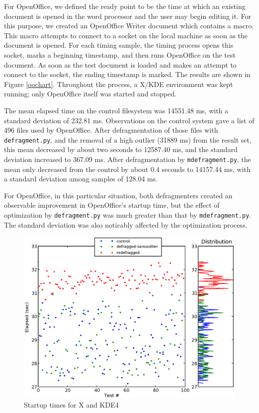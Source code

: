 \documentclass[10pt,twocolumn,letterpaper]{article}
\begin{document}
For OpenOffice, we defined the ready point to be the time at which an existing document is opened in the word processor and the user may begin editing it. For this purpose, we created an OpenOffice Writer document which contains a macro. This macro attempts to connect to a socket on the local machine as soon as the document is opened. For each timing sample, the timing process opens this socket, marks a beginning timestamp, and then runs OpenOffice on the test document. As soon as the test document is loaded and makes an attempt to connect to the socket, the ending timestamp is marked. The results are shown in Figure \ref{oochart}. Throughout the process, a X/KDE environment was kept running; only OpenOffice itself was started and stopped.

The mean elapsed time on the control filesystem was 14551.48 ms, with a standard deviation of 232.81 ms. Observations on the control system gave a list of 496 files used by OpenOffice. After
defragmentation of those files with \texttt{defragment.py}, and the removal of a high outlier (31889 ms) from the result set, this mean decreased by about two seconds to 12587.40 ms, and the standard deviation increased to 367.09 ms. After defragmentation by \texttt{mdefragment.py}, the mean only decreased from the control by about 0.4 seconds to 14157.44 ms, with a standard deviation among samples of 128.04 ms.

For OpenOffice, in this particular situation, both defragmenters created an observable improvement in OpenOffice's startup time, but the effect of optimization by \texttt{defragment.py} was much greater than that by \texttt{mdefragment.py}. The standard deviation was also noticably affected by the optimization process.

\begin{figure}[!htb]
\includegraphics[scale=0.75]{kde4-chart.eps}
\caption{Startup times for X and KDE4}
\label{kde4chart}
\end{figure}
\end{document}
